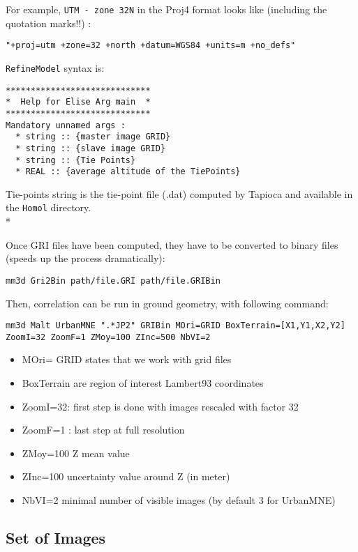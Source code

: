 For example, {\tt UTM - zone 32N} in the Proj4 format looks like (including the quotation marks!!) :
\begin{verbatim}
"+proj=utm +zone=32 +north +datum=WGS84 +units=m +no_defs"
 \end{verbatim}
{\tt RefineModel} syntax is:

\begin{verbatim}
*****************************
*  Help for Elise Arg main  *
*****************************
Mandatory unnamed args :
  * string :: {master image GRID}
  * string :: {slave image GRID}
  * string :: {Tie Points}
  * REAL :: {average altitude of the TiePoints}
\end{verbatim}

Tie-points string is the tie-point file (.dat) computed by Tapioca and available in the {\tt Homol} directory.\\*

Once GRI files have been computed, they have to be converted to binary files (speeds up the process dramatically):
\begin{verbatim}
mm3d Gri2Bin path/file.GRI path/file.GRIBin
\end{verbatim}

Then, correlation can be run in ground geometry, with following command:

\begin{verbatim}
mm3d Malt UrbanMNE ".*JP2" GRIBin MOri=GRID BoxTerrain=[X1,Y1,X2,Y2]
ZoomI=32 ZoomF=1 ZMoy=100 ZInc=500 NbVI=2
\end{verbatim}

\begin{itemize}
 \item MOri= GRID states that we work with grid files
 \item   BoxTerrain are region of interest Lambert93 coordinates
 \item   ZoomI=32: first step is done with images rescaled with factor 32
 \item   ZoomF=1 : last step at full resolution
 \item   ZMoy=100  Z mean value
 \item   ZInc=100 uncertainty value around Z (in meter)
 \item   NbVI=2 minimal number of visible images  (by default 3 for UrbanMNE)
\end{itemize}

\subsection{Set of Images}

